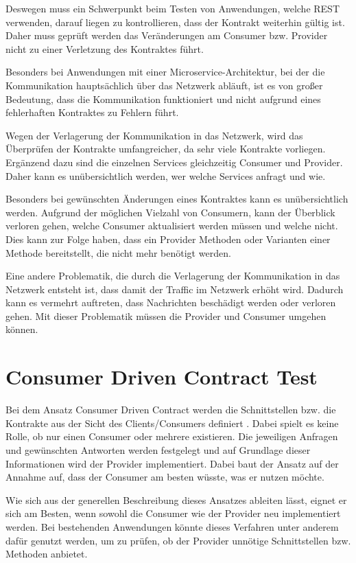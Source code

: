 \documentclass{llncs}
\begin{document}
Deswegen muss ein Schwerpunkt beim Testen von Anwendungen, welche REST verwenden, darauf liegen zu kontrollieren, dass der Kontrakt weiterhin gültig ist. Daher muss geprüft werden das Veränderungen am Consumer bzw. Provider nicht zu einer Verletzung des Kontraktes führt.

Besonders bei Anwendungen mit einer Microservice-Architektur, bei der die Kommunikation hauptsächlich über das Netzwerk abläuft, ist es von großer Bedeutung, dass die Kommunikation funktioniert und nicht aufgrund eines fehlerhaften Kontraktes zu Fehlern führt.

Wegen der Verlagerung der Kommunikation in das Netzwerk, wird das Überprüfen der Kontrakte umfangreicher, da sehr viele Kontrakte vorliegen. Ergänzend dazu sind die einzelnen Services gleichzeitig Consumer und Provider. Daher kann es unübersichtlich werden, wer welche Services anfragt und wie.

Besonders bei gewünschten Änderungen eines Kontraktes kann es unübersichtlich werden. Aufgrund der möglichen Vielzahl von Consumern, kann der Überblick verloren gehen, welche Consumer aktualisiert werden müssen und welche nicht. Dies kann zur Folge haben, dass ein Provider Methoden oder Varianten einer Methode bereitstellt, die nicht mehr benötigt werden.

Eine andere Problematik, die durch die Verlagerung der Kommunikation in das Netzwerk entsteht ist, dass damit der Traffic im Netzwerk erhöht wird. Dadurch kann es vermehrt auftreten, dass Nachrichten beschädigt werden oder verloren gehen. Mit dieser Problematik müssen die Provider und Consumer umgehen können.

\section{Consumer Driven Contract Test}
Bei dem Ansatz Consumer Driven Contract werden die Schnittstellen bzw. die Kontrakte aus der Sicht des Clients/Consumers definiert \cite{Robinson2006, bayer2015jaxcenter, vitz2016inno}. Dabei spielt es keine Rolle, ob nur einen Consumer oder mehrere existieren. Die jeweiligen Anfragen und gewünschten Antworten werden festgelegt und auf Grundlage dieser Informationen wird der Provider implementiert. Dabei baut der Ansatz auf der Annahme auf, dass der Consumer am besten wüsste, was er nutzen möchte.

Wie sich aus der generellen Beschreibung dieses Ansatzes ableiten lässt, eignet er sich am Besten, wenn sowohl die Consumer wie der Provider neu implementiert werden. Bei bestehenden Anwendungen könnte dieses Verfahren unter anderem dafür genutzt werden, um zu prüfen, ob der Provider unnötige Schnittstellen bzw. Methoden anbietet.
\end{document}
